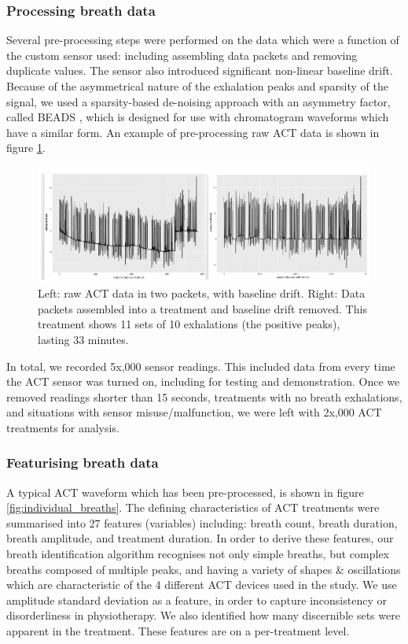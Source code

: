 \documentclass{article}
\begin{document}
\subsubsection{Processing breath data}

Several pre-processing steps were performed on the data which were a function of the custom sensor used: including assembling data packets and removing duplicate values. The sensor also introduced significant non-linear baseline drift. Because of the asymmetrical nature of the exhalation peaks and sparsity of the signal, we used a sparsity-based de-noising approach with an asymmetry factor, called BEADS \cite{Ning2014}, which is designed for use with chromatogram waveforms which have a similar form. An example of pre-processing raw ACT data is shown in figure \ref{fig:ACTpreprocessing}.

\begin{figure}[htb]
  \includegraphics[width=\textwidth]{ACTpreprocessing.png}
  \centering
   \caption{Left: raw ACT data in two packets, with baseline drift. Right: Data packets assembled into a treatment and baseline drift removed. This treatment shows 11 sets of 10 exhalations (the positive peaks), lasting 33 minutes.}
  \label{fig:ACTpreprocessing}
\end{figure}

In total, we recorded 5x,000 sensor readings. This included data from every time the ACT sensor was turned on, including for testing and demonstration. Once we removed readings shorter than 15 seconds, treatments with no breath exhalations, and situations with sensor misuse/malfunction, we were left with 2x,000 ACT treatments for analysis. 

\subsubsection{Featurising breath data}

A typical ACT waveform which has been pre-processed, is shown in figure \ref{fig:individual_breaths}. The defining characteristics of ACT treatments were summarised into 27 features (variables) including: breath count, breath duration, breath amplitude, and treatment duration. In order to derive these features, our breath identification algorithm recognises not only simple breaths, but complex breaths composed of multiple peaks, and having a variety of shapes & oscillations which are characteristic of the 4 different ACT devices used in the study. We use amplitude standard deviation as a feature, in order to capture inconsistency or disorderliness in physiotherapy. We also identified how many discernible sets were apparent in the treatment. These features are on a per-treatment level. 
\end{document}
